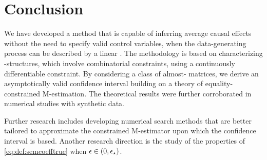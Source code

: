 \section{Conclusion}

We have developed a method that is capable of inferring average causal effects without the need to specify valid control variables, when the data-generating process can be described by a linear \scm. The methodology is based on characterizing \DAG{}-structures, which involve combinatorial constraints, using a continuously differentiable constraint. By considering a class of almost-\DAG{} matrices, we derive an asymptotically valid confidence interval building on a theory of equality-constrained M-estimation. The theoretical results were further corroborated in numerical studies with synthetic data.

Further research includes developing numerical search methods that are better tailored to approximate the constrained M-estimator upon which the confidence interval is based. Another research direction is the study of the properties of \eqref{eq:def:semcoefftrue} when $\epsilon \in ( 0 , \epsilon_\star)$.

